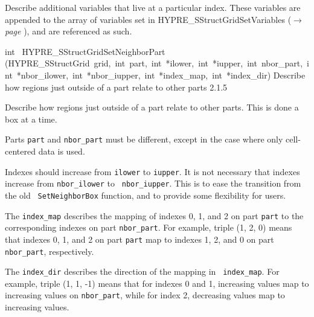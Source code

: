 \documentclass{article}
\begin{document}
\begin{cxxentry}
\begin{cxxentry}
\begin{cxxfunction}
\begin{cxxdoc}
Describe additional variables that live at a particular index.  These
variables are appended to the array of variables set in
HYPRE\_SStructGridSetVariables ($\rightarrow$ {\em page \pageref{cxx.2.1.11}}), and are referenced as such.
\end{cxxdoc}
\end{cxxfunction}
\begin{cxxfunction}
{int\ }
        {HYPRE\_SStructGridSetNeighborPart}
        {(HYPRE\_SStructGrid\ grid,\ int\ part,\ int\ *ilower,\ int\ *iupper,\ int\ nbor\_part,\ int\ *nbor\_ilower,\ int\ *nbor\_iupper,\ int\ *index\_map,\ int\ *index\_dir)}
        {
Describe how regions just outside of a part relate to other parts}
        {2.1.5}
\begin{cxxdoc}

Describe how regions just outside of a part relate to other parts.  This is
done a box at a time.

Parts {\tt part} and {\tt nbor\_part} must be different, except in the case
where only cell-centered data is used.

Indexes should increase from {\tt ilower} to {\tt iupper}.  It is not
necessary that indexes increase from {\tt nbor\_ilower} to {\tt
nbor\_iupper}.  This is to ease the transition from the old {\tt
SetNeighborBox} function, and to provide some flexibility for users.

The {\tt index\_map} describes the mapping of indexes 0, 1, and 2 on part
{\tt part} to the corresponding indexes on part {\tt nbor\_part}.  For
example, triple (1, 2, 0) means that indexes 0, 1, and 2 on part {\tt part}
map to indexes 1, 2, and 0 on part {\tt nbor\_part}, respectively.

The {\tt index\_dir} describes the direction of the mapping in {\tt
index\_map}.  For example, triple (1, 1, -1) means that for indexes 0 and 1,
increasing values map to increasing values on {\tt nbor\_part}, while for
index 2, decreasing values map to increasing values.


\end{cxxdoc}
\end{cxxfunction}
\end{cxxentry}
\end{cxxentry}
\end{document}
